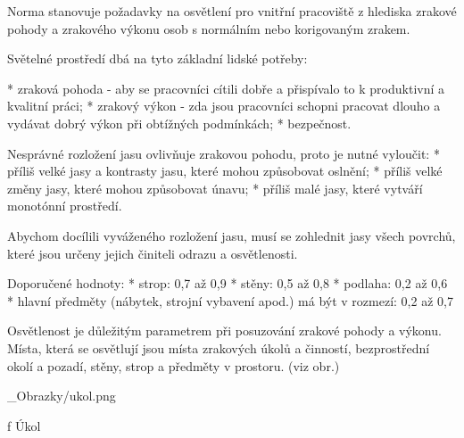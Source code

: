 \noindent

Norma stanovuje požadavky na osvětlení pro vnitřní pracoviště z hlediska zrakové pohody a zrakového výkonu osob s normálním nebo korigovaným zrakem.


\noindent Světelné prostředí dbá na tyto základní lidské potřeby:

\begitems 
* zraková pohoda - aby se pracovníci cítili dobře a přispívalo to k produktivní a kvalitní práci;
* zrakový výkon - zda jsou pracovníci schopni pracovat dlouho a vydávat dobrý výkon při obtížných podmínkách;
* bezpečnost.
\enditems


\noindent Nesprávné rozložení jasu ovlivňuje zrakovou pohodu, proto je nutné vyloučit:
\begitems 
* příliš velké jasy a kontrasty jasu, které mohou způsobovat oslnění;
* příliš velké změny jasy, které mohou způsobovat únavu;
* příliš malé jasy, které vytváří monotónní prostředí.
\enditems

\noindent Abychom docílili vyváženého rozložení jasu, musí se zohlednit jasy všech povrchů, které jsou určeny jejich činiteli odrazu a osvětlenosti.
\medskip
{}

\noindent Doporučené hodnoty:
\begitems 
* strop: 0,7 až 0,9
* stěny: 0,5 až 0,8
* podlaha: 0,2 až 0,6
* hlavní předměty (nábytek, strojní vybavení apod.) má být v rozmezí: 0,2 až 0,7
\enditems




Osvětlenost je důležitým parametrem při posuzování zrakové pohody a výkonu. Místa, která se osvětlují jsou místa zrakových úkolů a činností,
bezprostřední okolí a pozadí, stěny, strop a předměty v prostoru. (viz obr.)

\medskip {}
\picw=8cm _Obrazky/ukol.png
\caption/f Úkol
\medskip

